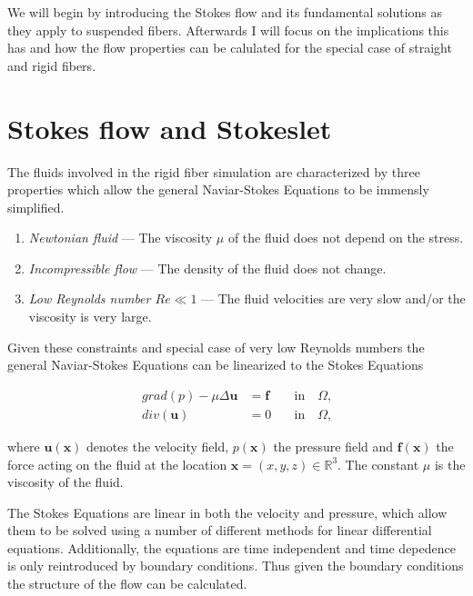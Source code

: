 \documentclass[a4paper,11pt]{kth-mag}
\begin{document}
We will begin by introducing the Stokes flow and its fundamental solutions as they apply to suspended fibers. Afterwards I will focus on the implications this has and how the flow properties can be calulated for the special case of straight and rigid fibers.

\section{Stokes flow and Stokeslet}
The fluids involved in the rigid fiber simulation are characterized by three properties which allow the general Naviar-Stokes Equations to be immensly simplified.
\begin{enumerate}
  \item{\textit{Newtonian fluid} — The viscosity $\mu$ of the fluid does not depend on the stress.}
  \item{\textit{Incompressible flow} — The density of the fluid does not change.}
  \item{\textit{Low Reynolds number $Re \ll 1$} — The fluid velocities are very slow and/or the viscosity is very large.}
\end{enumerate}

Given these constraints and special case of very low Reynolds numbers the general Naviar-Stokes Equations can be linearized to the Stokes Equations

\begin{equation}
\label{eq:stokes_equations}
\begin{aligned}
    grad(p) - \mu \Delta \mathbf{u} &= \mathbf{f} \quad &\text{in} \quad \Omega \text{,}\\
    div(\mathbf{u}) &= 0 \quad &\text{in} \quad \Omega \text{,}
\end{aligned}
\end{equation}

where $\mathbf{u}(\mathbf{x})$ denotes the velocity field, $p(\mathbf{x})$ the pressure field and $\mathbf{f}(\mathbf{x})$ the force acting on the fluid at the location $\mathbf{x} = (x,y,z) \in \mathbb{R}^3$.
The constant $\mu$ is the viscosity of the fluid.

The Stokes Equations are linear in both the velocity and pressure, which allow them to be solved using a number of different methods for linear differential equations. Additionally, the equations are time independent and time depedence is only reintroduced by boundary conditions. Thus given the boundary conditions the structure of the flow can be calculated.
\end{document}
